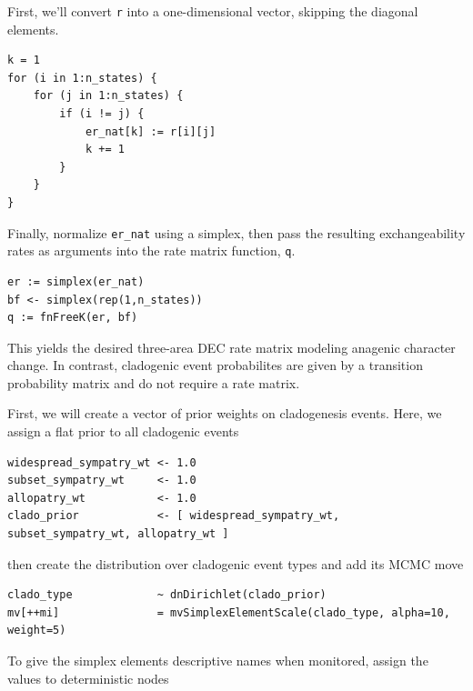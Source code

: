 First, we'll convert {\tt r} into a one-dimensional vector, skipping the diagonal elements.

\begin{snugshade}
\begin{lstlisting}
k = 1
for (i in 1:n_states) {
    for (j in 1:n_states) {
        if (i != j) {
            er_nat[k] := r[i][j]
            k += 1
        }
    }
}
\end{lstlisting}
\end{snugshade}

Finally, normalize {\tt er\_nat} using a simplex, then pass the resulting exchangeability rates as arguments into the rate matrix function, {\tt q}.

\begin{snugshade}
\begin{lstlisting}
er := simplex(er_nat)
bf <- simplex(rep(1,n_states))
q := fnFreeK(er, bf)
\end{lstlisting}
\end{snugshade}

This yields the desired three-area DEC rate matrix modeling anagenic character change. In contrast, cladogenic event probabilites are given by a transition probability matrix and do not require a rate matrix.

First, we will create a vector of prior weights on cladogenesis events. Here, we assign a flat prior to all cladogenic events

\begin{snugshade}
\begin{lstlisting}
widespread_sympatry_wt <- 1.0
subset_sympatry_wt     <- 1.0
allopatry_wt           <- 1.0
clado_prior            <- [ widespread_sympatry_wt, subset_sympatry_wt, allopatry_wt ]
\end{lstlisting}
\end{snugshade}

then create the distribution over cladogenic event types and add its MCMC move

\begin{snugshade}
\begin{lstlisting}
clado_type             ~ dnDirichlet(clado_prior)
mv[++mi]               = mvSimplexElementScale(clado_type, alpha=10, weight=5)
\end{lstlisting}
\end{snugshade}

To give the simplex elements descriptive names when monitored, assign the values to deterministic nodes

